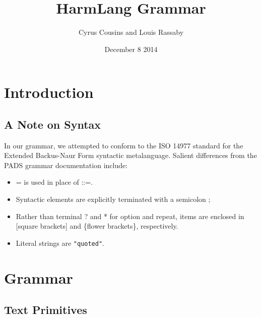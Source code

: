 \documentclass{article}
\title{HarmLang Grammar}
\author{Cyrus Cousins and Louis Rassaby}
\date{December 8 2014}
\begin{document}
\maketitle

\tableofcontents


\section{Introduction}

\subsection{A Note on Syntax}

In our grammar, we attempted to conform to the ISO 14977 standard for the Extended Backus-Naur Form syntactic metalanguage.  Salient differences from the PADS grammar documentation include:

\begin{itemize}
\item = is used in place of ::=.
\item Syntactic elements are explicitly terminated with a semicolon ;
\item Rather than terminal ? and * for option and repeat, items are enclosed in [square brackets] and \{flower brackets\}, respectively.
\item Literal strings are \texttt{"quoted"}.
\end{itemize}

\section{Grammar}
\subsection{Text Primitives}
\end{document}
